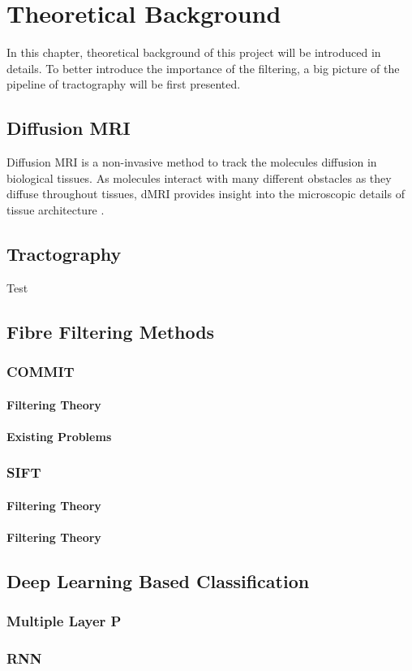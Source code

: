 \chapter{Theoretical Background}


In this chapter, theoretical background of this project will be introduced in details. To better introduce the importance of the filtering, a big picture of the pipeline of tractography will be first presented. 

\section{Diffusion MRI}

Diffusion MRI is a non-invasive method to track the molecules diffusion in biological tissues. As molecules interact with many different obstacles as they diffuse throughout tissues, dMRI provides insight into the microscopic details of tissue architecture \cite{newman_chapter_2014}. 

\section{Tractography}

Test \autocite{dhollanderFixelbasedAnalysisDiffusion2021}


\section{Fibre Filtering Methods}

\subsection{COMMIT}

\subsubsection{Filtering Theory}

\subsubsection{Existing Problems}

\subsection{SIFT}

\subsubsection{Filtering Theory}

\subsubsection{Filtering Theory}

\section{Deep Learning Based Classification}

\subsection{Multiple Layer P}
\subsection{RNN}




